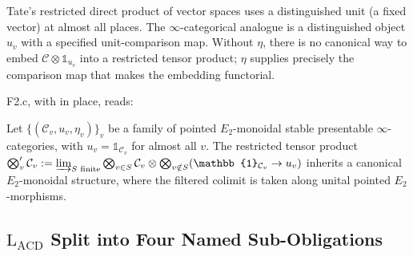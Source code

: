 \begin{remark}
\label{v4-arith:sw:rem:why-pointed}
Tate's restricted direct product of vector spaces uses a
distinguished unit (a fixed vector) at almost all places. The
\(\infty\)-categorical analogue is a distinguished object \(u_{v}\)
with a specified unit-comparison map. Without \(\eta\), there is no canonical way to embed
\(\mathcal{C}\otimes\mathbb{1}_{u_{v}}\) into a restricted tensor
product; \(\eta\) supplies precisely the comparison map that makes the
embedding functorial.
\end{remark}

F2.c, with  in place, reads:

\begin{conjecture}[F2.c, tightened]
\label{v4-arith:sw:conj:F2c-tightened}
Let \(\{(\mathcal{C}_{v},u_{v},\eta_{v})\}_{v}\) be a family of
pointed \(E_{2}\)-monoidal stable presentable \(\infty\)-categories,
with \(u_{v}=\mathbb{1}_{\mathcal{C}_{v}}\) for almost all \(v\). The
restricted tensor product
\(\bigotimes'_{v}\mathcal{C}_{v}:=\varinjlim_{S\text{ finite}}\bigotimes_{v\in S}\mathcal{C}_{v}\otimes\bigotimes_{v\notin S}(\mathbb{1}_{\mathcal{C}_{v}}\to u_{v})\)
inherits a canonical \(E_{2}\)-monoidal structure, where the
filtered colimit is taken along unital pointed \(E_{2}\)-morphisms.
\end{conjecture}

\subsection{\texorpdfstring{\(\mathrm{L}_{\mathrm{ACD}}\)}{L-ACD} Split into Four Named Sub-Obligations}

